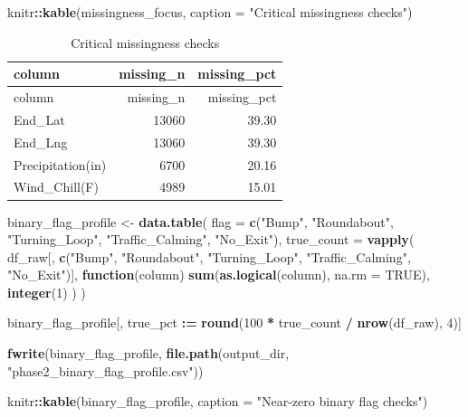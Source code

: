 \documentclass[
]{article}
\newenvironment{Shaded}{\begin{snugshade}}{\end{snugshade}}
\newcommand{\AttributeTok}[1]{\textcolor[rgb]{0.13,0.29,0.53}{#1}}
\newcommand{\ConstantTok}[1]{\textcolor[rgb]{0.56,0.35,0.01}{#1}}
\newcommand{\ControlFlowTok}[1]{\textcolor[rgb]{0.13,0.29,0.53}{\textbf{#1}}}
\newcommand{\DecValTok}[1]{\textcolor[rgb]{0.00,0.00,0.81}{#1}}
\newcommand{\FunctionTok}[1]{\textcolor[rgb]{0.13,0.29,0.53}{\textbf{#1}}}
\newcommand{\NormalTok}[1]{#1}
\newcommand{\OtherTok}[1]{\textcolor[rgb]{0.56,0.35,0.01}{#1}}
\newcommand{\SpecialCharTok}[1]{\textcolor[rgb]{0.81,0.36,0.00}{\textbf{#1}}}
\newcommand{\StringTok}[1]{\textcolor[rgb]{0.31,0.60,0.02}{#1}}
\begin{document}
\begin{Shaded}
\begin{Highlighting}[]
\NormalTok{knitr}\SpecialCharTok{::}\FunctionTok{kable}\NormalTok{(missingness\_focus, }\AttributeTok{caption =} \StringTok{"Critical missingness checks"}\NormalTok{)}
\end{Highlighting}
\end{Shaded}

\begin{longtable}[]{@{}lrr@{}}
\caption{Critical missingness checks}\tabularnewline
\toprule\noalign{}
column & missing\_n & missing\_pct \\
\midrule\noalign{}
\endfirsthead
\toprule\noalign{}
column & missing\_n & missing\_pct \\
\midrule\noalign{}
\endhead
\bottomrule\noalign{}
\endlastfoot
End\_Lat & 13060 & 39.30 \\
End\_Lng & 13060 & 39.30 \\
Precipitation(in) & 6700 & 20.16 \\
Wind\_Chill(F) & 4989 & 15.01 \\
\end{longtable}

\begin{Shaded}
\begin{Highlighting}[]
\NormalTok{binary\_flag\_profile }\OtherTok{\textless{}{-}} \FunctionTok{data.table}\NormalTok{(}
  \AttributeTok{flag =} \FunctionTok{c}\NormalTok{(}\StringTok{"Bump"}\NormalTok{, }\StringTok{"Roundabout"}\NormalTok{, }\StringTok{"Turning\_Loop"}\NormalTok{, }\StringTok{"Traffic\_Calming"}\NormalTok{, }\StringTok{"No\_Exit"}\NormalTok{),}
  \AttributeTok{true\_count =} \FunctionTok{vapply}\NormalTok{(}
\NormalTok{    df\_raw[, }\FunctionTok{c}\NormalTok{(}\StringTok{"Bump"}\NormalTok{, }\StringTok{"Roundabout"}\NormalTok{, }\StringTok{"Turning\_Loop"}\NormalTok{, }\StringTok{"Traffic\_Calming"}\NormalTok{, }\StringTok{"No\_Exit"}\NormalTok{)],}
    \ControlFlowTok{function}\NormalTok{(column) }\FunctionTok{sum}\NormalTok{(}\FunctionTok{as.logical}\NormalTok{(column), }\AttributeTok{na.rm =} \ConstantTok{TRUE}\NormalTok{),}
    \FunctionTok{integer}\NormalTok{(}\DecValTok{1}\NormalTok{)}
\NormalTok{  )}
\NormalTok{)}

\NormalTok{binary\_flag\_profile[, true\_pct }\SpecialCharTok{:=} \FunctionTok{round}\NormalTok{(}\DecValTok{100} \SpecialCharTok{*}\NormalTok{ true\_count }\SpecialCharTok{/} \FunctionTok{nrow}\NormalTok{(df\_raw), }\DecValTok{4}\NormalTok{)]}

\FunctionTok{fwrite}\NormalTok{(binary\_flag\_profile, }\FunctionTok{file.path}\NormalTok{(output\_dir, }\StringTok{"phase2\_binary\_flag\_profile.csv"}\NormalTok{))}

\NormalTok{knitr}\SpecialCharTok{::}\FunctionTok{kable}\NormalTok{(binary\_flag\_profile, }\AttributeTok{caption =} \StringTok{"Near{-}zero binary flag checks"}\NormalTok{)}
\end{Highlighting}
\end{Shaded}
\end{document}
